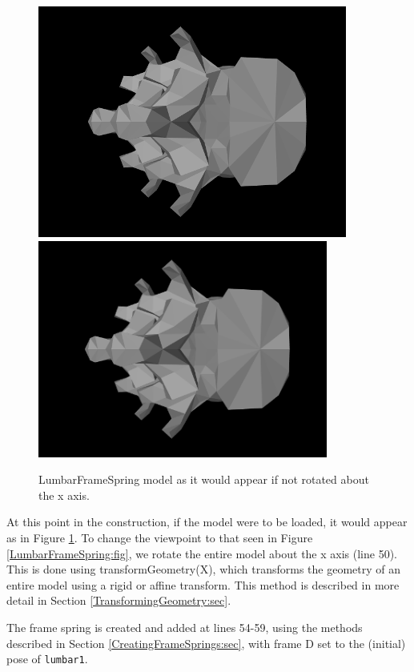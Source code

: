 \begin{figure}[ht]
\begin{center}
\iflatexml
 \includegraphics[]{images/LumbarFrameSpringNoflip}
\else
 \includegraphics[width=3.75in]{images/LumbarFrameSpringNoflip}
\fi
\end{center}
\caption{LumbarFrameSpring model as it would appear if not rotated
about the x axis.}
\label{LumbarFrameSpringNoflip:fig}
\end{figure}

At this point in the construction, if the model were to be loaded, it
would appear as in Figure \ref{LumbarFrameSpringNoflip:fig}. To change
the viewpoint to that seen in Figure \ref{LumbarFrameSpring:fig}, we
rotate the entire model about the x axis (line 50).  This is done
using
{transformGeometry(X)}, which transforms the geometry of an entire
model using a rigid or affine transform. This method is
described in more detail in Section \ref{TransformingGeometry:sec}.

The frame spring is created and added at lines 54-59, using the
methods described in Section \ref{CreatingFrameSprings:sec}, with
frame D set to the (initial) pose of {\tt lumbar1}.

